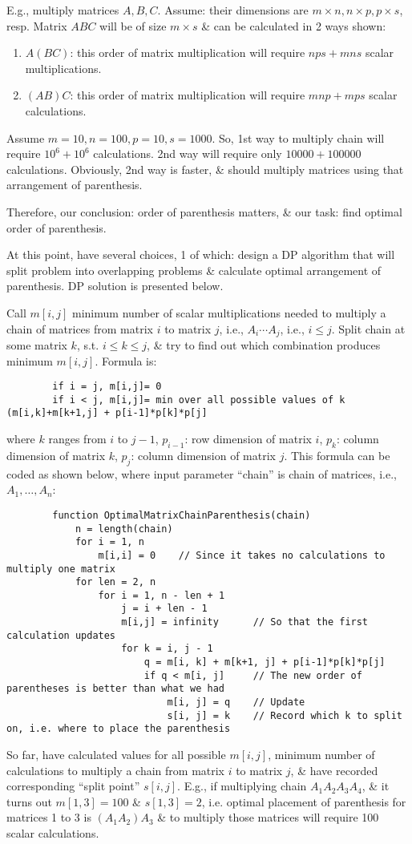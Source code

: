 \documentclass{article}
\begin{document}
\begin{enumerate}
	E.g., multiply matrices $A,B,C$. Assume: their dimensions are $m\times n,n\times p,p\times s$, resp. Matrix $ABC$ will be of size $m\times s$ \& can be calculated in 2 ways shown:
	\begin{enumerate}
		\item $A(BC)$: this order of matrix multiplication will require $nps + mns$ scalar multiplications.
		\item $(AB)C$: this order of matrix multiplication will require $mnp + mps$ scalar calculations.
	\end{enumerate}
	Assume $m = 10,n = 100,p = 10,s = 1000$. So, 1st way to multiply chain will require $10^6 + 10^6$ calculations. 2nd way will require only $10000 + 100000$ calculations. Obviously, 2nd way is faster, \& should multiply matrices using that arrangement of parenthesis.

	Therefore, our conclusion: order of parenthesis matters, \& our task: find optimal order of parenthesis.

	At this point, have several choices, 1 of which: design a DP algorithm that will split problem into overlapping problems \& calculate optimal arrangement of parenthesis. DP solution is presented below.

	Call $m[i,j]$ minimum number of scalar multiplications needed to multiply a chain of matrices from matrix $i$ to matrix $j$, i.e., $A_i\cdots A_j$, i.e., $i\le j$. Split chain at some matrix $k$, s.t. $i\le k\le j$, \& try to find out which combination produces minimum $m[i,j]$. Formula is:
	\begin{verbatim}
		if i = j, m[i,j]= 0
		if i < j, m[i,j]= min over all possible values of k (m[i,k]+m[k+1,j] + p[i-1]*p[k]*p[j]
	\end{verbatim}
	where $k$ ranges from $i$ to $j - 1$, $p_{i - 1}$: row dimension of matrix $i$, $p_k$: column dimension of matrix $k$, $p_j$: column dimension of matrix $j$. This formula can be coded as shown below, where input parameter ``chain'' is chain of matrices, i.e., $A_1,\ldots,A_n$:
	\begin{verbatim}
		function OptimalMatrixChainParenthesis(chain)
		    n = length(chain)
		    for i = 1, n
		        m[i,i] = 0    // Since it takes no calculations to multiply one matrix
		    for len = 2, n
		        for i = 1, n - len + 1
		            j = i + len - 1
		            m[i,j] = infinity      // So that the first calculation updates
		            for k = i, j - 1
		                q = m[i, k] + m[k+1, j] + p[i-1]*p[k]*p[j]
		                if q < m[i, j]     // The new order of parentheses is better than what we had
		                    m[i, j] = q    // Update
		                    s[i, j] = k    // Record which k to split on, i.e. where to place the parenthesis
	\end{verbatim}
	So far, have calculated values for all possible $m[i,j]$, minimum number of calculations to multiply a chain from matrix $i$ to matrix $j$, \& have recorded corresponding ``split point'' $s[i,j]$. E.g., if multiplying chain $A_1A_2A_3A_4$, \& it turns out $m[1,3] = 100$ \& $s[1,3] = 2$, i.e. optimal placement of parenthesis for matrices 1 to 3 is $(A_1A_2)A_3$ \& to multiply those matrices will require 100 scalar calculations.


\end{enumerate}
\end{document}
